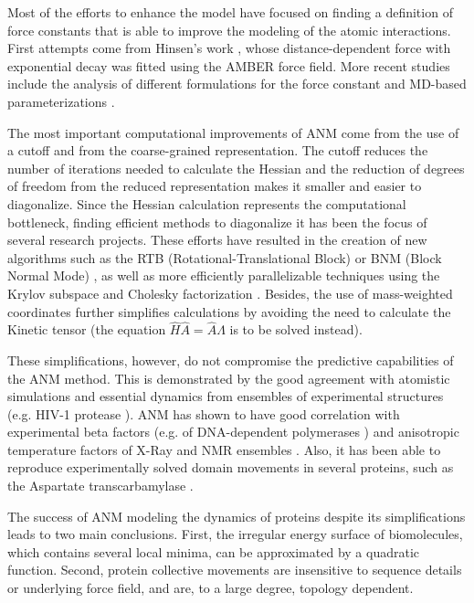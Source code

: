 Most of the efforts to enhance the model have focused on finding a definition of force constants that is able to improve the modeling of the atomic interactions. First attempts come from Hinsen's work \cite{hinsen_analysis_1998}, whose distance-dependent force with exponential decay was fitted using the AMBER force field. More recent studies include the analysis of different formulations for the force constant \cite{sen_optimizing_2005} and MD-based parameterizations \cite{orellana_approaching_2010}. 

The most important computational improvements of ANM come from the use of a cutoff and from the coarse-grained representation. The cutoff reduces the number of iterations needed to calculate the Hessian and the reduction of degrees of freedom from the reduced representation makes it smaller and easier to diagonalize. Since the Hessian calculation represents  the computational bottleneck, finding efficient methods to diagonalize it has been the focus of several research projects. These efforts have resulted in the creation of new algorithms such as the RTB (Rotational-Translational Block) \cite{tama_building-block_2000} or BNM (Block Normal Mode) \cite{li_coarse-grained_2002}, as well as more efficiently parallelizable techniques using the Krylov subspace and Cholesky factorization \cite{lopez-blanco_imod_2011}. Besides, the use of mass-weighted coordinates further simplifies calculations by avoiding the need to calculate the Kinetic tensor (the equation $\hat{H} \hat{A} = \hat{A} \hat{\Lambda}$ is to be solved instead). 

These simplifications, however, do not compromise the predictive capabilities of the ANM method. This is demonstrated by the good agreement with atomistic simulations \cite{ahmed_large-scale_2010, rueda_thorough_2007} and essential dynamics from ensembles of experimental structures (e.g. HIV-1 protease \cite{yang_close_2008}). ANM has shown to have good correlation with experimental beta factors (e.g. of DNA-dependent polymerases \cite{delarue_simplified_2002}) and anisotropic temperature factors of X-Ray and NMR ensembles \cite{yang_comparisons_2009}. Also, it has been able to reproduce experimentally solved domain movements in several proteins, such as the Aspartate transcarbamylase \cite{thomas_tertiary_1999}. 

The success of ANM modeling the dynamics of proteins despite its simplifications leads to two main conclusions. First, the irregular energy surface of biomolecules, which contains several local minima, can be approximated by a quadratic function. Second, protein collective movements are insensitive to sequence details or underlying force field, and are, to a large degree, topology dependent. 


